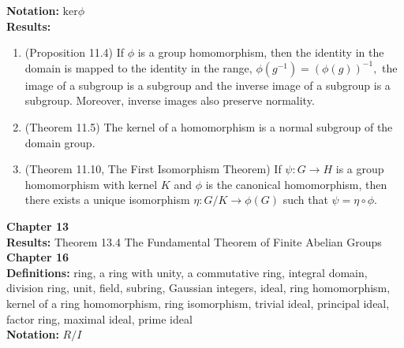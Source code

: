 \documentclass[12pt]{article}
\begin{document}
\noindent \textbf{Notation:} $\text{ker}\phi$\\

\noindent \textbf{Results:} \\
\begin{enumerate}
	\item (Proposition 11.4) If $\phi$ is a group homomorphism, then the identity in the domain is mapped to the identity in the range,  $\phi(g^{-1})=(\phi(g))^{-1},$ the image of a subgroup is a subgroup and the inverse image of a subgroup is a subgroup. Moreover, inverse images also preserve normality.
	\item (Theorem 11.5)  The kernel of a homomorphism is a normal subgroup of the domain group.
	\item (Theorem 11.10, The First Isomorphism Theorem) If $\psi: G \to H$ is a group homomorphism with kernel $K$ and $\phi$ is the canonical homomorphism, then there exists a unique isomorphism $\eta: G/K \to \phi(G)$ such that $\psi=\eta \circ \phi.$
\end{enumerate}

\noindent \textbf{Chapter 13}\\

%

\noindent \textbf{Results:} Theorem 13.4 The Fundamental Theorem of Finite Abelian Groups\\

\noindent \textbf{Chapter 16}\\

\noindent \textbf{Definitions:} ring, a ring with unity, a commutative ring, integral domain, division ring, unit, field, subring, Gaussian integers, ideal, ring homomorphism, kernel of a ring homomorphism, ring isomorphism,  trivial ideal, principal ideal, factor ring, maximal ideal, prime ideal \\

\noindent \textbf{Notation:} $R/I$\\
\end{document}
